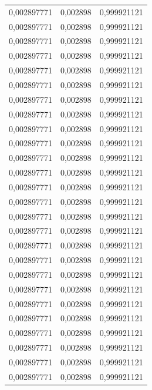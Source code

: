 \begin{center}
\begin{longtable}{|l|l|l|}
0,002897771        & 0,002898              & 0,999921121  \\
0,002897771        & 0,002898              & 0,999921121  \\
0,002897771        & 0,002898              & 0,999921121  \\
0,002897771        & 0,002898              & 0,999921121  \\
0,002897771        & 0,002898              & 0,999921121  \\
0,002897771        & 0,002898              & 0,999921121  \\
0,002897771        & 0,002898              & 0,999921121  \\
0,002897771        & 0,002898              & 0,999921121  \\
0,002897771        & 0,002898              & 0,999921121  \\
0,002897771        & 0,002898              & 0,999921121  \\
0,002897771        & 0,002898              & 0,999921121  \\
0,002897771        & 0,002898              & 0,999921121  \\
0,002897771        & 0,002898              & 0,999921121  \\
0,002897771        & 0,002898              & 0,999921121  \\
0,002897771        & 0,002898              & 0,999921121  \\
0,002897771        & 0,002898              & 0,999921121  \\
0,002897771        & 0,002898              & 0,999921121  \\
0,002897771        & 0,002898              & 0,999921121  \\
0,002897771        & 0,002898              & 0,999921121  \\
0,002897771        & 0,002898              & 0,999921121  \\
0,002897771        & 0,002898              & 0,999921121  \\
0,002897771        & 0,002898              & 0,999921121  \\
0,002897771        & 0,002898              & 0,999921121  \\
0,002897771        & 0,002898              & 0,999921121  \\
0,002897771        & 0,002898              & 0,999921121  \\
0,002897771        & 0,002898              & 0,999921121  \\

\end{longtable}
\end{center}
